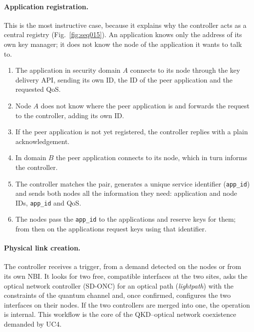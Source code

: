 \paragraph{Application registration.}
This is the most instructive case, because it explains why the controller
acts as a central registry (Fig.~\ref{fig:seq015}). An application knows
only the address of its own key manager; it does not know the node of the
application it wants to talk to.
\begin{enumerate}
  \item The application in security domain $A$ connects to its node
        through the key delivery API, sending its own ID, the ID of the
        peer application and the requested QoS.
  \item Node $A$ does not know where the peer application is and forwards
        the request to the controller, adding its own ID.
  \item If the peer application is not yet registered, the controller
        replies with a plain acknowledgement.
  \item In domain $B$ the peer application connects to its node, which in
        turn informs the controller.
  \item The controller matches the pair, generates a unique service
        identifier (\texttt{app\_id}) and sends both nodes all the
        information they need: application and node IDs, \texttt{app\_id}
        and QoS.
  \item The nodes pass the \texttt{app\_id} to the applications and reserve
        keys for them; from then on the applications request keys using
        that identifier.
\end{enumerate}



\paragraph{Physical link creation.}
The controller receives a trigger, from a demand detected on the nodes or
from its own NBI. It looks for two free, compatible interfaces at the two
sites, asks the optical network controller (SD-ONC) for an optical path
(\emph{lightpath}) with the constraints of the quantum channel and, once
confirmed, configures the two interfaces on their nodes. If the two
controllers are merged into one, the operation is internal. This workflow
is the core of the QKD–optical network coexistence demanded by UC4.


